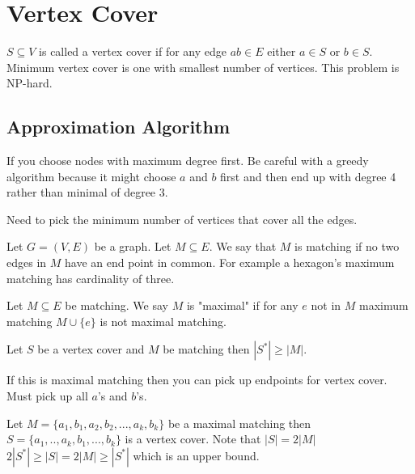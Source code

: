 \documentclass[12pt,twoside,letterpaper]{article}
\begin{document}
\section*{Vertex Cover}
$S \subseteq V$ is called a vertex cover if for any edge $ab \in E$ either $a \in S$ or $b \in S$. Minimum vertex cover is one with smallest number of vertices. This problem is NP-hard.

\subsection*{Approximation Algorithm}
If you choose nodes with maximum degree first. Be careful with a greedy algorithm because it might choose $a$ and $b$ first and then end up with degree 4 rather than minimal of degree 3.

Need to pick the minimum number of vertices that cover all the edges.

Let $G=(V,E)$ be a graph.
Let $M \subseteq E$. We say that $M$ is matching if no two edges in $M$ have an end point in common. For example a hexagon's maximum matching has cardinality of three.

Let $M \subseteq E$ be matching. We say $M$ is "maximal" if for any $e$ not in $M$ maximum matching $M \cup \{ e \}$ is not maximal matching.

Let $S$ be a vertex cover and $M$ be matching then $|S^*| \ge |M|$.

If this is maximal matching then you can pick up endpoints for vertex cover. Must pick up all $a$'s and $b$'s.

Let $M=\{a_1,b_1,a_2,b_2,...,a_k,b_k\}$ be a maximal matching then $S=\{a_1,..,a_k,b_1,...,b_k\}$ is a vertex cover. Note that $|S|=2|M|$\\
$2|S^*| \ge |S| = 2|M| \ge |S^*|$ which is an upper bound.
\end{document}
